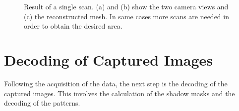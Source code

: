 \documentclass[final,12pt,3p]{elsarticle}
\begin{document}
\begin{figure}[!ht]
	\caption{\label{fig:singleScan}{Result of a single scan. (a) and (b) show the two camera views and (c) the reconstructed mesh. In same cases more scans are needed in order to obtain the desired area.}}
\end{figure}


\section{Decoding of Captured Images}
\label{sec:decoding}

Following the acquisition of the data, the next step is the decoding of the captured images. This involves the calculation of the shadow masks and the decoding of the patterns.
\end{document}
